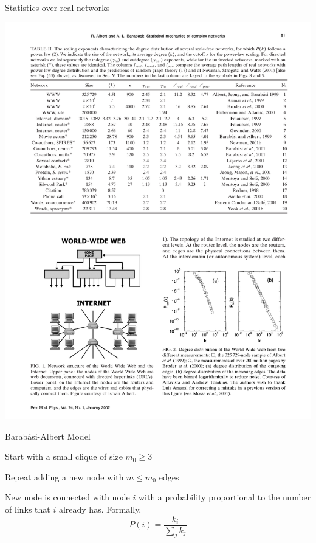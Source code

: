 \begin{frame}{Statistics over real networks}
	
\includegraphics[width=\textwidth]{statistics2}

\end{frame}

\begin{frame}{Barab\'{a}si-Albert Model}

\begin{definition}
\BI
\item Start with a small clique of size $m_0 \geq 3$
\item Repeat adding a new node with $m \leq m_0$ edges
\item New node is connected with node $i$ with a probability proportional to the
number of links that $i$ already has. Formally,
\[
  P(i) = \frac{k_i}{\sum_j k_j}
\]
\EI
\end{definition}

\end{frame}

